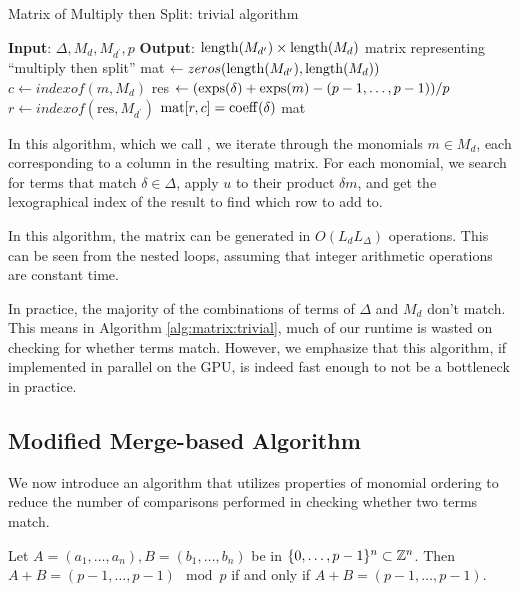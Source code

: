 \begin{algorithm}[H]
    \caption{Matrix of Multiply then Split: trivial algorithm}
    \label{alg:matrix:trivial}
    \begin{algorithmic}[1]
    \State \textbf{Input}: $\Delta, M_{d}, M_{d^{\prime}}, p$
    \State \textbf{Output}: $\operatorname{length}(M_{d^{\prime}}) \times \operatorname{length}(M_{d})$ 
	matrix representing ``multiply then split''
    \State mat $\gets zeros(\operatorname{length}(M_{d^{\prime}}), \operatorname{length}(M_{d}))$
	    \State $c \gets indexof(m, M _{d})$
        \For{$\delta \in \Delta$}
             
			\State res $\gets (\operatorname{exps}(\delta) + \operatorname{exps}(m) - (p-1, \ldots, p-1)) / p$ 
				\State $r \gets indexof(\text{res},M_{d^{\prime}})$
                \State $\text{mat}[r, c] = \operatorname{coeff}(\delta)$
            \EndIf
        \EndFor
    \EndFor
    \State \Return mat
    \end{algorithmic}
\end{algorithm}

In this algorithm, which we call \triv, we iterate through 
the monomials $m \in M_{d}$, each corresponding to a column in the
resulting matrix. For each monomial, we search for terms 
that match $\delta \in \Delta$, apply $u$ to their product $\delta m$, and 
get the lexographical index of the result to find which 
row to add to.

In this algorithm, the matrix can be generated in 
$O(L_{d}L_{\Delta})$ operations. 
This can be
seen from the nested loops, assuming that integer 
arithmetic operations are constant time.

In practice, the majority of the combinations of 
terms of $\Delta$ and $M_{d}$ don't match. This means in
Algorithm \ref{alg:matrix:trivial}, much of our 
runtime is wasted on checking for whether terms match.
However, we emphasize that this algorithm, if 
implemented in parallel on the GPU, is indeed
fast enough to not be a bottleneck in practice.

\subsection{Modified Merge-based Algorithm}

We now introduce an algorithm that utilizes 
properties of monomial ordering to reduce the 
number of comparisons 
performed in checking whether two terms match.

\begin{lem}
	\label{lem:tuples:modp}
	Let \(A = (a_{1}, \ldots, a_{n}),
	B = (b_{1}, \ldots, b_{n})\)
	be in \(\{0, \ldots, p-1\}^{n} \subset \mathbb{Z}^{n}\).
	Then \(A + B = 
	(p-1, \ldots, p-1) \mod p\)
	if and only if 
	\(A + B = 
	(p-1, \ldots, p-1)\).
\end{lem}

